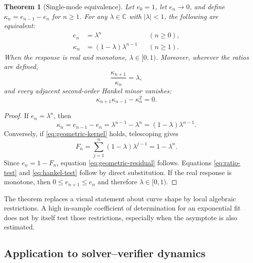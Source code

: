 \documentclass[10pt,twocolumn]{article}
\newtheorem{theorem}{Theorem}
\newcommand{\CC}{\mathbb{C}}
\begin{document}
\begin{theorem}[Single-mode equivalence]\label{thm:single-mode}
Let $e_0=1$, let $e_n\to0$, and define $\kappa_n=e_{n-1}-e_n$ for $n\geq1$.
For any $\lambda\in\CC$ with $|\lambda|<1$, the following are equivalent:
\begin{align}
 e_n&=\lambda^n &&(n\geq0), \label{eq:geometric-residual}\\
 \kappa_n&=(1-\lambda)\lambda^{n-1} &&(n\geq1).
 \label{eq:geometric-kernel}
\end{align}
When the response is real and monotone, $\lambda\in[0,1)$.  Moreover, wherever
the ratios are defined,
\begin{equation}\label{eq:ratio-test}
 \frac{\kappa_{n+1}}{\kappa_n}=\lambda,
\end{equation}
and every adjacent second-order Hankel minor vanishes:
\begin{equation}\label{eq:hankel-test}
 \kappa_{n+1}\kappa_{n-1}-\kappa_n^2=0.
\end{equation}
\end{theorem}

\begin{proof}
If $e_n=\lambda^n$, then
\[
 \kappa_n=e_{n-1}-e_n
 =\lambda^{n-1}-\lambda^n
 =(1-\lambda)\lambda^{n-1}.
\]
Conversely, if \eqref{eq:geometric-kernel} holds, telescoping gives
\[
 F_n=\sum_{j=1}^{n}(1-\lambda)\lambda^{j-1}=1-\lambda^n.
\]
Since $e_n=1-F_n$, equation \eqref{eq:geometric-residual} follows.  Equations
\eqref{eq:ratio-test} and \eqref{eq:hankel-test} follow by direct substitution.
If the real response is monotone, then $0\leq e_{n+1}\leq e_n$ and therefore
$\lambda\in[0,1)$.
\end{proof}

The theorem replaces a visual statement about curve shape by local algebraic
restrictions.  A high in-sample coefficient of determination for an
exponential fit does not by itself test those restrictions, especially when
the asymptote is also estimated.

\subsection{Application to solver--verifier dynamics}
\end{document}
